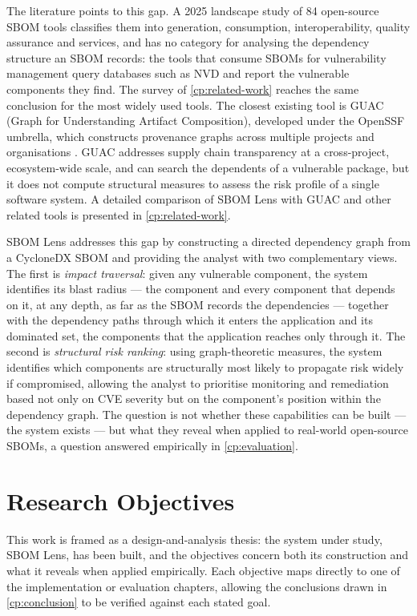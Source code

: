 The literature points to this gap. A 2025 landscape study of 84 open-source SBOM tools \citep{Garcia2025} classifies them into generation, consumption, interoperability, quality assurance and services, and has no category for analysing the dependency structure an SBOM records: the tools that consume SBOMs for vulnerability management query databases such as NVD and report the vulnerable components they find. The survey of \autoref{cp:related-work} reaches the same conclusion for the most widely used tools. The closest existing tool is GUAC (Graph for Understanding Artifact Composition), developed under the OpenSSF umbrella, which constructs provenance graphs across multiple projects and organisations \citep{GUAC2024}. GUAC addresses supply chain transparency at a cross-project, ecosystem-wide scale, and can search the dependents of a vulnerable package, but it does not compute structural measures to assess the risk profile of a single software system. A detailed comparison of SBOM Lens with GUAC and other related tools is presented in \autoref{cp:related-work}.

SBOM Lens addresses this gap by constructing a directed dependency graph from a CycloneDX SBOM and providing the analyst with two complementary views. The first is \textit{impact traversal}: given any vulnerable component, the system identifies its blast radius --- the component and every component that depends on it, at any depth, as far as the SBOM records the dependencies --- together with the dependency paths through which it enters the application and its dominated set, the components that the application reaches only through it. The second is \textit{structural risk ranking}: using graph-theoretic measures, the system identifies which components are structurally most likely to propagate risk widely if compromised, allowing the analyst to prioritise monitoring and remediation based not only on CVE severity but on the component's position within the dependency graph. The question is not whether these capabilities can be built --- the system exists --- but what they reveal when applied to real-world open-source SBOMs, a question answered empirically in \autoref{cp:evaluation}.


\section{Research Objectives}
\label{sec:objectives}

This work is framed as a design-and-analysis thesis: the system under study, SBOM Lens, has been built, and the objectives concern both its construction and what it reveals when applied empirically. Each objective maps directly to one of the implementation or evaluation chapters, allowing the conclusions drawn in \autoref{cp:conclusion} to be verified against each stated goal.

